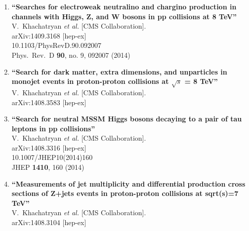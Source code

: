 \documentclass{article}
\begin{document}
\begin{enumerate}
\item%
{\bf ``Searches for electroweak neutralino and chargino production in channels with Higgs, Z, and W bosons in pp collisions at 8 TeV''}
  \\{}V.~Khachatryan {\it et al.}  [CMS Collaboration].
  \\{}arXiv:1409.3168 [hep-ex]
    \\{}10.1103/PhysRevD.90.092007
\\{}Phys.\ Rev.\ D {\bf 90}, no. 9, 092007 (2014) %


\item%
{\bf ``Search for dark matter, extra dimensions, and unparticles in monojet events in proton-proton collisions at $\sqrt{s}$ = 8 TeV''}
  \\{}V.~Khachatryan {\it et al.}  [CMS Collaboration].
  \\{}arXiv:1408.3583 [hep-ex]
  


\item%
{\bf ``Search for neutral MSSM Higgs bosons decaying to a pair of tau leptons in pp collisions''}
  \\{}V.~Khachatryan {\it et al.}  [CMS Collaboration].
  \\{}arXiv:1408.3316 [hep-ex]
    \\{}10.1007/JHEP10(2014)160
\\{}JHEP {\bf 1410}, 160 (2014) %


\item%
{\bf ``Measurements of jet multiplicity and differential production cross sections of Z+jets events in proton-proton collisions at sqrt(s)=7 TeV''}
  \\{}V.~Khachatryan {\it et al.}  [CMS Collaboration].
  \\{}arXiv:1408.3104 [hep-ex]
  



\end{enumerate}
\end{document}
